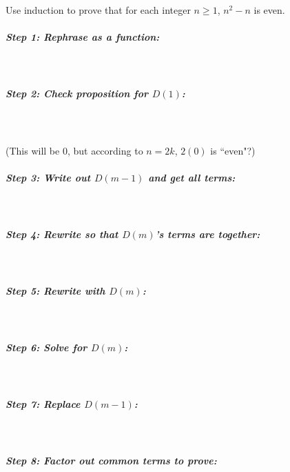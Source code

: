 \documentclass[a4paper,12pt]{book}
\newcounter{question}
\begin{document}
        \newpage
        
        \begin{questionNOGRADE}{\thequestion}
            Use induction to prove that for each integer $n \geq 1$, $n^{2} - n$ is even.

            \subparagraph{Step 1: Rephrase as a function:} ~\\
            
            \subparagraph{Step 2: Check proposition for $D(1)$:} ~\\
            ~\\ (This will be 0, but according to $n = 2k$, $2(0)$ is ``even"?)

            \subparagraph{Step 3: Write out $D(m-1)$ and get all terms:} ~\\      

            \subparagraph{Step 4: Rewrite so that $D(m)$'s terms are together:} ~\\

            \subparagraph{Step 5: Rewrite with $D(m)$:}~\\

            \subparagraph{Step 6: Solve for $D(m)$:}~\\

            \subparagraph{Step 7: Replace $D(m-1)$:}~\\

            \subparagraph{Step 8: Factor out common terms to prove:}~\\
        \end{questionNOGRADE}
        
\end{document}
